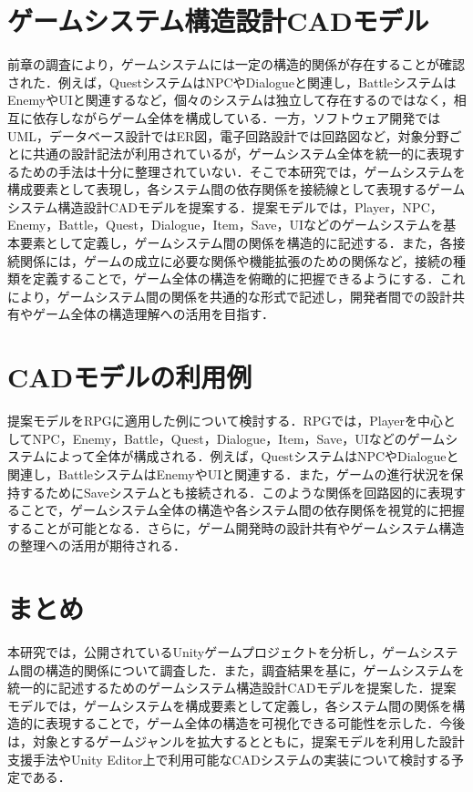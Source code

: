 \documentclass[twocolumn,a4paper,dvipdfmx]{ieicejsp}
\begin{document}
\section{ゲームシステム構造設計CADモデル}
前章の調査により，ゲームシステムには一定の構造的関係が存在することが確認された．例えば，QuestシステムはNPCやDialogueと関連し，BattleシステムはEnemyやUIと関連するなど，個々のシステムは独立して存在するのではなく，相互に依存しながらゲーム全体を構成している．一方，ソフトウェア開発ではUML，データベース設計ではER図，電子回路設計では回路図など，対象分野ごとに共通の設計記法が利用されているが，ゲームシステム全体を統一的に表現するための手法は十分に整理されていない．そこで本研究では，ゲームシステムを構成要素として表現し，各システム間の依存関係を接続線として表現するゲームシステム構造設計CADモデルを提案する．提案モデルでは，Player，NPC，Enemy，Battle，Quest，Dialogue，Item，Save，UIなどのゲームシステムを基本要素として定義し，ゲームシステム間の関係を構造的に記述する．また，各接続関係には，ゲームの成立に必要な関係や機能拡張のための関係など，接続の種類を定義することで，ゲーム全体の構造を俯瞰的に把握できるようにする．これにより，ゲームシステム間の関係を共通的な形式で記述し，開発者間での設計共有やゲーム全体の構造理解への活用を目指す．


\section{CADモデルの利用例}
提案モデルをRPGに適用した例について検討する．RPGでは，Playerを中心としてNPC，Enemy，Battle，Quest，Dialogue，Item，Save，UIなどのゲームシステムによって全体が構成される．例えば，QuestシステムはNPCやDialogueと関連し，BattleシステムはEnemyやUIと関連する．また，ゲームの進行状況を保持するためにSaveシステムとも接続される．このような関係を回路図的に表現することで，ゲームシステム全体の構造や各システム間の依存関係を視覚的に把握することが可能となる．さらに，ゲーム開発時の設計共有やゲームシステム構造の整理への活用が期待される．


\section{まとめ}
本研究では，公開されているUnityゲームプロジェクトを分析し，ゲームシステム間の構造的関係について調査した．また，調査結果を基に，ゲームシステムを統一的に記述するためのゲームシステム構造設計CADモデルを提案した．提案モデルでは，ゲームシステムを構成要素として定義し，各システム間の関係を構造的に表現することで，ゲーム全体の構造を可視化できる可能性を示した．今後は，対象とするゲームジャンルを拡大するとともに，提案モデルを利用した設計支援手法やUnity Editor上で利用可能なCADシステムの実装について検討する予定である．



\end{document}
